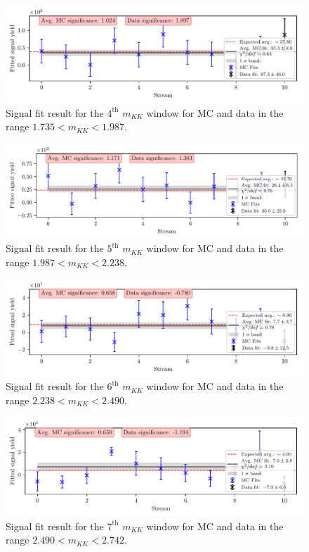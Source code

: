 \begin{figure}[H]
	\centering
	\captionsetup{width=0.8\linewidth}
	\includegraphics[width=\linewidth]{fig/sig_mKK_4}
	\caption{Signal fit result for the $4^{\mathrm{th}}$ $m_{KK}$ window for MC and data in the range $1.735<m_{KK}<1.987$.}
\end{figure}

\begin{figure}[H]
	\centering
	\captionsetup{width=0.8\linewidth}
	\includegraphics[width=\linewidth]{fig/sig_mKK_5}
	\caption{Signal fit result for the $5^{\mathrm{th}}$ $m_{KK}$ window for MC and data in the range $1.987<m_{KK}<2.238$.}
\end{figure}

\begin{figure}[H]
	\centering
	\captionsetup{width=0.8\linewidth}
	\includegraphics[width=\linewidth]{fig/sig_mKK_6}
	\caption{Signal fit result for the $6^{\mathrm{th}}$ $m_{KK}$ window for MC and data in the range $2.238<m_{KK}<2.490$.}
\end{figure}

\begin{figure}[H]
	\centering
	\captionsetup{width=0.8\linewidth}
	\includegraphics[width=\linewidth]{fig/sig_mKK_7}
	\caption{Signal fit result for the $7^{\mathrm{th}}$ $m_{KK}$ window for MC and data in the range $2.490<m_{KK}<2.742$.}
\end{figure}

